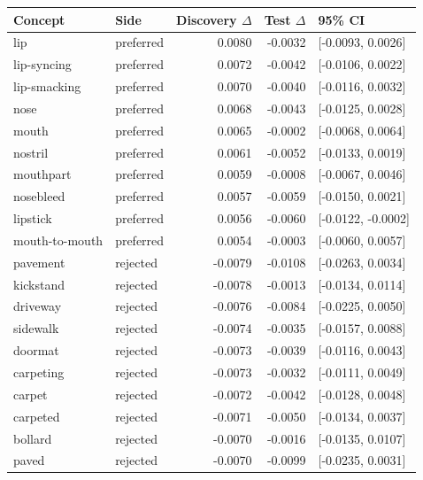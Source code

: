 \begin{tabular}{llrrl}
\toprule
Concept & Side & Discovery $\Delta$ & Test $\Delta$ & 95\% CI \\
\midrule
lip & preferred & 0.0080 & -0.0032 & [-0.0093, 0.0026] \\
lip-syncing & preferred & 0.0072 & -0.0042 & [-0.0106, 0.0022] \\
lip-smacking & preferred & 0.0070 & -0.0040 & [-0.0116, 0.0032] \\
nose & preferred & 0.0068 & -0.0043 & [-0.0125, 0.0028] \\
mouth & preferred & 0.0065 & -0.0002 & [-0.0068, 0.0064] \\
nostril & preferred & 0.0061 & -0.0052 & [-0.0133, 0.0019] \\
mouthpart & preferred & 0.0059 & -0.0008 & [-0.0067, 0.0046] \\
nosebleed & preferred & 0.0057 & -0.0059 & [-0.0150, 0.0021] \\
lipstick & preferred & 0.0056 & -0.0060 & [-0.0122, -0.0002] \\
mouth-to-mouth & preferred & 0.0054 & -0.0003 & [-0.0060, 0.0057] \\
pavement & rejected & -0.0079 & -0.0108 & [-0.0263, 0.0034] \\
kickstand & rejected & -0.0078 & -0.0013 & [-0.0134, 0.0114] \\
driveway & rejected & -0.0076 & -0.0084 & [-0.0225, 0.0050] \\
sidewalk & rejected & -0.0074 & -0.0035 & [-0.0157, 0.0088] \\
doormat & rejected & -0.0073 & -0.0039 & [-0.0116, 0.0043] \\
carpeting & rejected & -0.0073 & -0.0032 & [-0.0111, 0.0049] \\
carpet & rejected & -0.0072 & -0.0042 & [-0.0128, 0.0048] \\
carpeted & rejected & -0.0071 & -0.0050 & [-0.0134, 0.0037] \\
bollard & rejected & -0.0070 & -0.0016 & [-0.0135, 0.0107] \\
paved & rejected & -0.0070 & -0.0099 & [-0.0235, 0.0031] \\
\bottomrule
\end{tabular}

